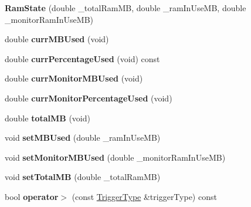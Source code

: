 \begin{DoxyCompactItemize}
\item 
{\bfseries Ram\+State} (double \+\_\+total\+Ram\+MB, double \+\_\+ram\+In\+Use\+MB, double \+\_\+monitor\+Ram\+In\+Use\+MB)\hypertarget{classRamState_a4912c894e281046584ea3bf2b1b29b00}{}\label{classRamState_a4912c894e281046584ea3bf2b1b29b00}

\item 
double {\bfseries curr\+M\+B\+Used} (void)\hypertarget{classRamState_a4dfe7387bb173f4d728e0229a51e3dde}{}\label{classRamState_a4dfe7387bb173f4d728e0229a51e3dde}

\item 
double {\bfseries curr\+Percentage\+Used} (void) const \hypertarget{classRamState_a53f3328ae46b132087672607052e5505}{}\label{classRamState_a53f3328ae46b132087672607052e5505}

\item 
double {\bfseries curr\+Monitor\+M\+B\+Used} (void)\hypertarget{classRamState_a466ea42215a7837a41cc9a6dbf7e678e}{}\label{classRamState_a466ea42215a7837a41cc9a6dbf7e678e}

\item 
double {\bfseries curr\+Monitor\+Percentage\+Used} (void)\hypertarget{classRamState_a72133a30f2022e6eaa8f93dc0cd57a9f}{}\label{classRamState_a72133a30f2022e6eaa8f93dc0cd57a9f}

\item 
double {\bfseries total\+MB} (void)\hypertarget{classRamState_ac8433fa656cf67da00dfdc48b6587fba}{}\label{classRamState_ac8433fa656cf67da00dfdc48b6587fba}

\item 
void {\bfseries set\+M\+B\+Used} (double \+\_\+ram\+In\+Use\+MB)\hypertarget{classRamState_abb016ce060940f92f342073088f65bc9}{}\label{classRamState_abb016ce060940f92f342073088f65bc9}

\item 
void {\bfseries set\+Monitor\+M\+B\+Used} (double \+\_\+monitor\+Ram\+In\+Use\+MB)\hypertarget{classRamState_aaaa615fa4dd8bd8c0d6cb56344c9d8fd}{}\label{classRamState_aaaa615fa4dd8bd8c0d6cb56344c9d8fd}

\item 
void {\bfseries set\+Total\+MB} (double \+\_\+total\+Ram\+MB)\hypertarget{classRamState_a7001938fa83271174c7790b6a9193d62}{}\label{classRamState_a7001938fa83271174c7790b6a9193d62}

\item 
bool {\bfseries operator$>$} (const \hyperlink{structTriggerType}{Trigger\+Type} \&trigger\+Type) const \hypertarget{classRamState_a89756fcad64ab046d2a9a013f726e09c}{}\label{classRamState_a89756fcad64ab046d2a9a013f726e09c}


\end{DoxyCompactItemize}
